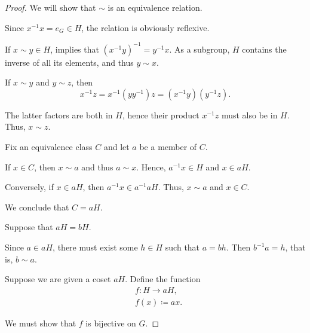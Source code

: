 \begin{proof}
   We will show that \( {\sim} \) is an equivalence relation.

   Since \( x^{-1} x = e_G \in H \), the relation is obviously reflexive.

   If \( x \sim y \in H \),  implies that \( (x^{-1} y)^{-1} = y^{-1} x \). As a subgroup, \( H \) contains the inverse of all its elements, and thus \( y \sim x \).

   If \( x \sim y \) and \( y \sim z \), then
  \begin{equation*}
    x^{-1} z
    =
    x^{-1} (y y^{-1}) z
    =
    (x^{-1} y) (y^{-1} z).
  \end{equation*}

  The latter factors are both in \( H \), hence their product \( x^{-1} z \) must also be in \( H \). Thus, \( x \sim z \).

   Fix an equivalence class \( C \) and let \( a \) be a member of \( C \).

  If \( x \in C \), then \( x \sim a \) and thus \( a \sim x \). Hence, \( a^{-1} x \in H \) and \( x \in a H \).

  Conversely, if \( x \in a H \), then \( a^{-1} x \in a^{-1} a H \). Thus, \( x \sim a \) and \( x \in C \).

  We conclude that \( C = a H \).

   Suppose that \( a H = b H \).

  Since \( a \in a H \), there must exist some \( h \in H \) such that \( a = b h \). Then \( b^{-1} a = h \), that is, \( b \sim a \).

   Suppose we are given a coset \( a H \). Define the function
  \begin{equation*}
    \begin{aligned}
      &f: H \to a H, \\
      &f(x) \coloneqq a x.
    \end{aligned}
  \end{equation*}

  We must show that \( f \) is bijective on \( G \).


\end{proof}
